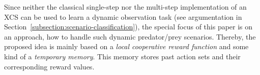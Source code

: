 Since neither the classical single-step nor the multi-step implementation of an XCS \cite{BW02} can be used to learn a dynamic observation task %
(see argumentation in Section~\ref{subsection:scenario-classification}), the special focus of this paper is on an approach, how to handle such dynamic predator/prey scenarios. Thereby, the proposed idea is mainly based on a \emph{local cooperative reward function} and some kind of a \emph{temporary memory}. This memory stores past action sets and their corresponding reward values. %


